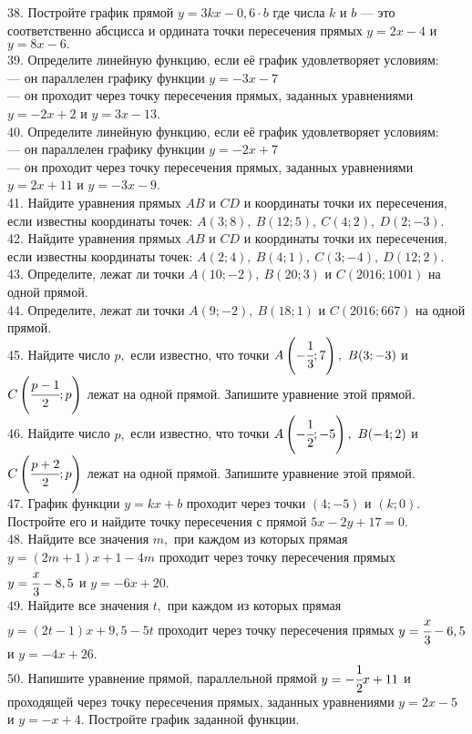 38. Постройте график прямой $y=3kx-0,6\cdot b$ где числа $k$ и $b$ --- это соответственно абсцисса и ордината точки пересечения прямых $y=2x-4$ и $y=8x-6.$\\
39. Определите линейную функцию, если её график удовлетворяет условиям:\\
--- он параллелен графику функции $y=-3x-7$\\
--- он проходит через точку пересечения прямых, заданных уравнениями $y=-2x+2$ и $y=3x-13.$\\
40. Определите линейную функцию, если её график удовлетворяет условиям:\\
--- он параллелен графику функции $y=-2x+7$\\
--- он проходит через точку пересечения прямых, заданных уравнениями $y=2x+11$ и $y=-3x-9.$\\
41. Найдите уравнения прямых $AB$ и $CD$ и координаты точки их пересечения, если известны координаты точек: $A(3;8),\ B(12;5),\ C(4;2),\ D(2;-3).$\\
42. Найдите уравнения прямых $AB$ и $CD$ и координаты точки их пересечения, если известны координаты точек: $A(2;4),\ B(4;1),\ C(3;-4),\ D(12;2).$\\
43. Определите, лежат ли точки $A(10;-2),\ B(20;3)$ и $C(2016;1001)$ на одной прямой.\\
44. Определите, лежат ли точки $A(9;-2),\ B(18;1)$ и $C(2016;667)$ на одной прямой.\\
45. Найдите число $p,$ если известно, что точки $A\left(-\cfrac{1}{3};7\right),\ B(3;-3)$ и $C\left(\cfrac{p-1}{2}; p\right)$ лежат на одной прямой. Запишите уравнение этой прямой.\\
46. Найдите число $p,$ если известно, что точки $A\left(-\cfrac{1}{2};-5\right),\ B(-4;2)$ и $C\left(\cfrac{p+2}{2}; p\right)$ лежат на одной прямой. Запишите уравнение этой прямой.\\
47. График функции $y=kx+b$ проходит через точки $(4;-5)$ и $(k;0).$ Постройте его и найдите точку пересечения с прямой $5x-2y+17=0.$\\
48. Найдите все значения $m,$ при каждом из которых прямая $y=(2m+1)x+1-4m$ проходит через точку пересечения прямых $y=\cfrac{x}{3}-8,5$ и $y=-6x+20.$\\
49. Найдите все значения $t,$ при каждом из которых прямая $y=(2t-1)x+9,5-5t$ проходит через точку пересечения прямых $y=\cfrac{x}{3}-6,5$ и $y=-4x+26.$\\
50. Напишите уравнение прямой, параллельной прямой $y=-\cfrac{1}{2}x+11$  и проходящей через точку пересечения прямых, заданных уравнениями $y=2x-5$ и $y=-x+4.$ Постройте график заданной функции.\\
